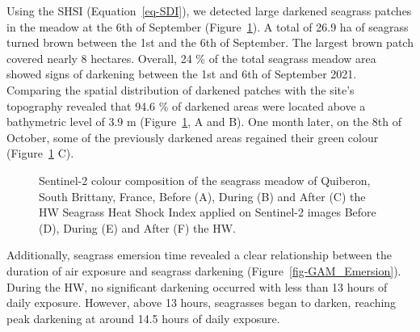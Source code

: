 \documentclass[
  letterpaper,
  11pt,
  english,
  singlespacing,
  headsepline]{MastersDoctoralThesis}
\begin{document}
\begin{spacing}{1.5}
\begin{figure}
\end{figure}%

Using the SHSI (Equation~\ref{eq-SDI}), we detected large darkened
seagrass patches in the meadow at the 6th of September
(Figure~\ref{fig-Map_darkening_Bathy}). A total of 26.9 ha of seagrass
turned brown between the 1st and the 6th of September. The largest brown
patch covered nearly 8 hectares. Overall, 24 \% of the total seagrass
meadow area showed signs of darkening between the 1st and 6th of
September 2021. Comparing the spatial distribution of darkened patches
with the site's topography revealed that 94.6 \% of darkened areas were
located above a bathymetric level of 3.9 m
(Figure~\ref{fig-Map_darkening_Bathy}, A and B). One month later, on the
8th of October, some of the previously darkened areas regained their
green colour (Figure~\ref{fig-Map_darkening_Bathy} C).

\begin{figure}


\caption{\label{fig-Map_darkening_Bathy}Sentinel-2 colour composition of
the seagrass meadow of Quiberon, South Brittany, France, Before (A),
During (B) and After (C) the HW Seagrass Heat Shock Index applied on
Sentinel-2 images Before (D), During (E) and After (F) the HW.}

\end{figure}%

Additionally, seagrass emersion time revealed a clear relationship
between the duration of air exposure and seagrass darkening
(Figure~\ref{fig-GAM_Emersion}). During the HW, no significant darkening
occurred with less than 13 hours of daily exposure. However, above 13
hours, seagrasses began to darken, reaching peak darkening at around
14.5 hours of daily exposure.


\end{spacing}
\end{document}
